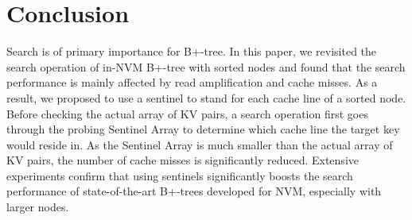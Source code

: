 \section{Conclusion}
Search is of primary importance for B+-tree. In this paper, we revisited the search operation of in-NVM B+-tree with sorted nodes and found that the search performance is mainly affected by read amplification and cache misses. As a result, we proposed to use a sentinel to stand for each cache line of a sorted node. Before checking the actual array of KV pairs, a search operation first goes through the probing Sentinel Array to determine which cache line the target key would reside in. As the Sentinel Array is much smaller than the actual array of KV pairs, the number of cache misses is significantly reduced. Extensive experiments confirm that using sentinels significantly boosts the search performance of state-of-the-art B+-trees developed for NVM, especially with larger nodes. 
